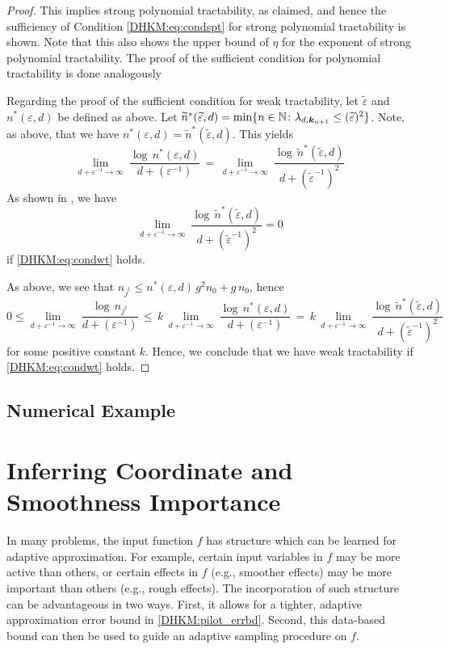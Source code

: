 \documentclass[USenglish]{article}
\theoremstyle{dgthm}
\theoremstyle{dgthm}
\theoremstyle{dgthm}
\theoremstyle{dgthm}
\theoremstyle{dgdef}
\begin{document}
{\begin{proof}
 This implies strong polynomial tractability, as claimed, and hence the sufficiency of Condition \eqref{DHKM:eq:condspt} for 
 strong polynomial tractability is shown. Note that this also shows the upper bound of $\eta$ for the exponent 
 of strong polynomial tractability. The proof of the sufficient condition for polynomial tractability is done analogously
 
 Regarding the proof of the sufficient condition for weak tractability, let $\widetilde{\varepsilon}$ and $n^*(\varepsilon,d)$ be defined as above. Let
 $\widetilde{n}^*(\widetilde{\varepsilon},d)=\min\{n\in{\mathbb{N}}\colon \lambda_{d,{\boldsymbol{k}}_{n+1}}\leq (\widetilde{\varepsilon})^2 \}$. 
 Note, as above, that we have $n^*(\varepsilon,d)=\widetilde{n}^*(\widetilde{\varepsilon},d)$. This yields
 $$   
\lim_{d+\varepsilon^{-1}\to\infty}\   
\frac{\log\, n^*(\varepsilon,d)}   
{d +(\varepsilon^{-1}) }\,=\, \lim_{d+\varepsilon^{-1}\to\infty}\   
\frac{\log\, \widetilde{n}^*(\widetilde{\varepsilon},d)}   
{d +(\widetilde{\varepsilon}^{-1})^{2}}  
$$ 
As shown in \cite{WerWoz17}, we have 
\[
 \lim_{d+\varepsilon^{-1}\to\infty}\   
\frac{\log\, \widetilde{n}^*(\widetilde{\varepsilon},d)}   
{d +(\widetilde{\varepsilon}^{-1})^{2}}=0
\]
if \eqref{DHKM:eq:condwt} holds. 

As above, we see that $n_{j^\dagger}\le n^*(\varepsilon,d)\, g^2 n_0+g\,n_0$, hence 
$$ 
  0\le\lim_{d+\varepsilon^{-1}\to\infty}\   
 \frac{\log\, n_{j^\dagger}}   
{d +(\varepsilon^{-1}) }
 \, \le\, k\,
\lim_{d+\varepsilon^{-1}\to\infty}\   
\frac{\log\, n^*(\varepsilon,d)}   
{d+(\varepsilon^{-1})}\,=\, k\,\lim_{d+\varepsilon^{-1}\to\infty}\   
\frac{\log\, \widetilde{n}^*(\widetilde{\varepsilon},d)}   
{d +(\widetilde{\varepsilon}^{-1})^{2}}  
$$
for some positive constant $k$.
Hence, we conclude that we have weak tractability if \eqref{DHKM:eq:condwt} holds. 
\end{proof}
}


\subsection{Numerical Example}

\section{Inferring Coordinate and Smoothness Importance} 

In many problems, the input function $f$ has structure which can be learned for adaptive approximation. For example, certain input variables in $f$ may be more active than others, or certain effects in $f$ (e.g., smoother effects) may be more important than others (e.g., rough effects). The incorporation of such structure can be advantageous in two ways. First, it allows for a tighter, adaptive approximation error bound in \eqref{DHKM:pilot_errbd}. Second, this data-based bound can then be used to guide an adaptive sampling procedure on $f$.
\end{document}
